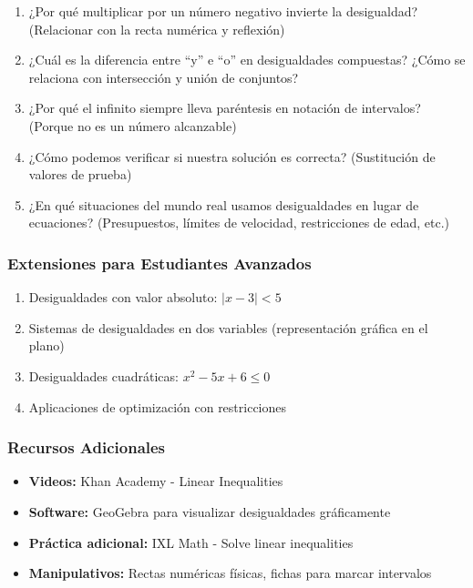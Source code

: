 \begin{enumerate}
    \item ¿Por qué multiplicar por un número negativo invierte la desigualdad? (Relacionar con la recta numérica y reflexión)

    \item ¿Cuál es la diferencia entre ``y'' e ``o'' en desigualdades compuestas? ¿Cómo se relaciona con intersección y unión de conjuntos?

    \item ¿Por qué el infinito siempre lleva paréntesis en notación de intervalos? (Porque no es un número alcanzable)

    \item ¿Cómo podemos verificar si nuestra solución es correcta? (Sustitución de valores de prueba)

    \item ¿En qué situaciones del mundo real usamos desigualdades en lugar de ecuaciones? (Presupuestos, límites de velocidad, restricciones de edad, etc.)
\end{enumerate}

\subsubsection*{Extensiones para Estudiantes Avanzados}

\begin{enumerate}
    \item Desigualdades con valor absoluto: $|x - 3| < 5$

    \item Sistemas de desigualdades en dos variables (representación gráfica en el plano)

    \item Desigualdades cuadráticas: $x^2 - 5x + 6 \le 0$

    \item Aplicaciones de optimización con restricciones
\end{enumerate}

\subsubsection*{Recursos Adicionales}

\begin{itemize}
    \item \textbf{Videos:} Khan Academy - Linear Inequalities
    \item \textbf{Software:} GeoGebra para visualizar desigualdades gráficamente
    \item \textbf{Práctica adicional:} IXL Math - Solve linear inequalities
    \item \textbf{Manipulativos:} Rectas numéricas físicas, fichas para marcar intervalos
\end{itemize}

